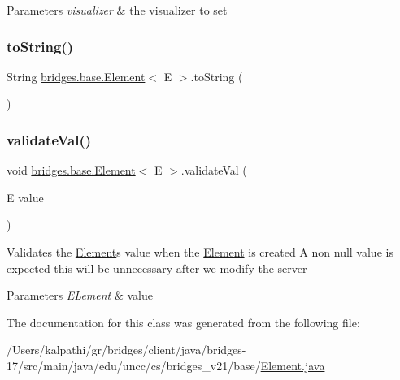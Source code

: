 \begin{DoxyParams}{Parameters}
{\em visualizer} & the visualizer to set \\
\hline
\end{DoxyParams}
\mbox{\label{classbridges_1_1base_1_1_element_a7dc685e317fd9dc2e73e049a9f907e42}} 
\subsubsection{\texorpdfstring{to\+String()}{toString()}}
{\footnotesize\ttfamily String \mbox{\hyperlink{classbridges_1_1base_1_1_element}{bridges.\+base.\+Element}}$<$ E $>$.to\+String (\begin{DoxyParamCaption}{ }\end{DoxyParamCaption})}

\mbox{\label{classbridges_1_1base_1_1_element_af1a60f4e6a91d379179f7d56e6dc3829}} 
\subsubsection{\texorpdfstring{validate\+Val()}{validateVal()}}
{\footnotesize\ttfamily void \mbox{\hyperlink{classbridges_1_1base_1_1_element}{bridges.\+base.\+Element}}$<$ E $>$.validate\+Val (\begin{DoxyParamCaption}\item[{E}]{value }\end{DoxyParamCaption})\hspace{0.3cm}{\ttfamily [protected]}}

Validates the \mbox{\hyperlink{classbridges_1_1base_1_1_element}{Element}}\textquotesingle{}s value when the \mbox{\hyperlink{classbridges_1_1base_1_1_element}{Element}} is created A non null value is expected this will be unnecessary after we modify the server 
\begin{DoxyParams}{Parameters}
{\em E\+Lement} & value \\
\hline
\end{DoxyParams}


The documentation for this class was generated from the following file\+:\begin{DoxyCompactItemize}
\item 
/\+Users/kalpathi/gr/bridges/client/java/bridges-\/17/src/main/java/edu/uncc/cs/bridges\+\_\+v21/base/\mbox{\hyperlink{_element_8java}{Element.\+java}}\end{DoxyCompactItemize}

